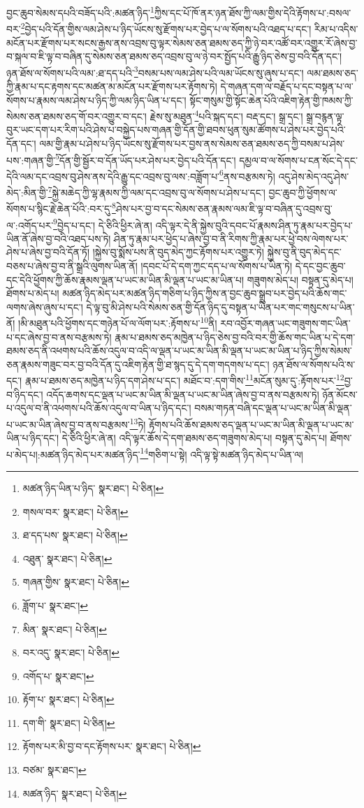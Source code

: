 བྱང་ཆུབ་སེམས་དཔའི་བཟོད་པའི་:མཚན་ཉིད་\footnote{མཚན་ཉིད་ཡིན་པ་ཉིད་  སྣར་ཐང་།  པེ་ཅིན། }ཀྱིས་དང་པོ་ཁོ་ནར་ཉན་ཐོས་ཀྱི་ལམ་གྱིས་དེའི་རྟོགས་པ་:བསལ་བར་\footnote{གསལ་བར་  སྣར་ཐང་།  པེ་ཅིན། }བྱེད་པའི་དོན་གྱིས་ལམ་ཤེས་པ་ཉིད་ཡོངས་སུ་རྫོགས་པར་བྱེད་པ་ལ་སོགས་པའི་འཐད་པ་དང་། རིམ་པ་འདིས་མངོན་པར་རྫོགས་པར་སངས་རྒྱས་ནས་འབྲས་བུ་ལྟར་སེམས་ཅན་ཐམས་ཅད་ཀྱི་ཉེ་བར་འཚོ་བར་འགྱུར་རོ་ཞེས་བྱ་བ་སྐལ་བ་ཇི་ལྟ་བ་བཞིན་དུ་སེམས་ཅན་ཐམས་ཅད་འབྲས་བུ་ལ་ཉེ་བར་སྤྱོད་པའི་རྒྱུ་ཉིད་ཅེས་བྱ་བའི་དོན་དང་། ཉན་ཐོས་ལ་སོགས་པའི་ལམ་:ཐ་དད་པའི་\footnote{ཐ་དད་པས་  སྣར་ཐང་།  པེ་ཅིན། }བསམ་པས་ལམ་ཤེས་པའི་ལམ་ཡོངས་སུ་ཞུས་པ་དང་། ལམ་ཐམས་ཅད་ཀྱི་རྣམ་པ་དང་རྟགས་དང་མཚན་མ་མངོན་པར་རྫོགས་པར་རྟོགས་ཏེ། དེ་གཞན་དག་ལ་བརྗོད་པ་དང་བསྟན་པ་ལ་སོགས་པ་རྣམས་ལམ་ཤེས་པ་ཉིད་ཀྱི་ལམ་ཉིད་ཡིན་པ་དང་། སྟོང་གསུམ་གྱི་སྟོང་ཆེན་པོའི་འཇིག་རྟེན་གྱི་ཁམས་ཀྱི་སེམས་ཅན་ཐམས་ཅད་གོ་བར་འགྱུར་བ་དང་། རྗེས་སུ་མཐུན་\footnote{འཐུན་  སྣར་ཐང་།  པེ་ཅིན། }པའི་སྐད་དང་། བརྡ་དང་། སྒྲ་དང་། སྒྲ་བརྙན་ལྟ་བུར་ཡང་དག་པར་རིག་པའི་ཤེས་པ་བསྐྱེད་པས་གཞན་གྱི་དོན་གྱི་ཐབས་ཕུན་སུམ་ཚོགས་པ་ཤེས་པར་བྱེད་པའི་དོན་དང་། ལམ་གྱི་རྣམ་པ་ཤེས་པ་ཉིད་ཡོངས་སུ་རྫོགས་པར་བྱས་ནས་སེམས་ཅན་ཐམས་ཅད་ཀྱི་བསམ་པ་ཤེས་པས་:གཞན་གྱི་\footnote{གཞན་གྱིས་  སྣར་ཐང་།  པེ་ཅིན། }དོན་གྱི་སྦྱོར་བ་དོན་ཡོད་པར་ཤེས་པར་བྱེད་པའི་དོན་དང་། དམྱལ་བ་ལ་སོགས་པ་ངན་སོང་དེ་དང་དེའི་ལམ་དང་འབྲས་བུ་ཤེས་ནས་དེའི་རྒྱུ་དང་འབྲས་བུ་ལས་:བཟློག་པ་\footnote{ཟློག་པ་  སྣར་ཐང་། }ནས་བརྩམས་ཏེ། འདུ་ཤེས་མེད་འདུ་ཤེས་མེད་:མིན་གྱི་\footnote{མིན་  སྣར་ཐང་།  པེ་ཅིན། }སྐྱེ་མཆེད་ཀྱི་ལྷ་རྣམས་ཀྱི་ལམ་དང་འབྲས་བུ་ལ་སོགས་པ་ཤེས་པ་དང་། བྱང་ཆུབ་ཀྱི་ཕྱོགས་ལ་སོགས་པ་སྙིང་རྗེ་ཆེན་པོའི་:བར་དུ་\footnote{བར་འདུ་  སྣར་ཐང་།  པེ་ཅིན། }ཤེས་པར་བྱ་བ་དང་སེམས་ཅན་རྣམས་ལམ་ཇི་ལྟ་བ་བཞིན་དུ་འབྲས་བུ་ལ་:འགོད་པར་\footnote{འགོད་པ་  སྣར་ཐང་། }བྱེད་པ་དང་། དེ་ཅིའི་ཕྱིར་ཞེ་ན། འདི་ལྟར་དེ་ནི་སྐྱེས་བུའི་དབང་པོ་རྣམས་ཤིན་ཏུ་རྣམ་པར་བྱེད་པ་ཡིན་ནོ་ཞེས་བྱ་བའི་འཐད་པས་ཏེ། ཤིན་ཏུ་རྣམ་པར་ཕྱེད་པ་ཞེས་བྱ་བ་ནི་རིགས་ཀྱི་རྣམ་པར་ཕྱེ་བས་ལེགས་པར་ཤེས་པ་ཞེས་བྱ་བའི་དོན་ཏོ། །སྐྱེས་བུ་སྨོས་པས་ནི་བུད་མེད་ཀྱང་རྟོགས་པར་འགྱུར་ཏེ། སྐྱེས་བུ་ནི་བུད་མེད་དང་བཅས་པ་ཞེས་བྱ་བ་ནི་སྒྲའི་ལུགས་ཡིན་ནོ། །དབང་པོ་དེ་དག་ཀྱང་དད་པ་ལ་སོགས་པ་ཡིན་ཏེ། དེ་དང་བྱང་ཆུབ་དང་དེའི་ཕྱོགས་ཀྱི་ཆོས་རྣམས་ལྡན་པ་ཡང་མ་ཡིན་མི་ལྡན་པ་ཡང་མ་ཡིན་པ། གཟུགས་མེད་པ། བསྟན་དུ་མེད་པ། ཐོགས་པ་མེད་པ། མཚན་ཉིད་མེད་པར་མཚན་ཉིད་གཅིག་པ་ཉིད་ཀྱིས་ན་བྱང་ཆུབ་སྒྲུབ་པར་བྱེད་པའི་ཆོས་གང་ལགས་ཞེས་ཞུས་པ་དང་། དེ་ལྟ་བུ་མི་ཤེས་པའི་སེམས་ཅན་གྱི་དོན་ཉིད་དུ་བསྟན་པ་ཡིན་པར་གང་གསུངས་པ་ཡིན་ནོ། །མི་མཐུན་པའི་ཕྱོགས་དང་གཉེན་པོ་ལ་ལོག་པར་:རྟོགས་པ་\footnote{རྟོག་པ་  སྣར་ཐང་།  པེ་ཅིན། }ནི། རབ་འབྱོར་གཞན་ཡང་གཟུགས་གང་ཡིན་པ་དང་ཞེས་བྱ་བ་ནས་བརྩམས་ཏེ། རྣམ་པ་ཐམས་ཅད་མཁྱེན་པ་ཉིད་ཅེས་བྱ་བའི་བར་གྱི་ཆོས་གང་ཡིན་པ་དེ་དག་ཐམས་ཅད་ནི་འཕགས་པའི་ཆོས་འདུལ་བ་འདི་ལ་ལྡན་པ་ཡང་མ་ཡིན་མི་ལྡན་པ་ཡང་མ་ཡིན་པ་ཉིད་ཀྱིས་སེམས་ཅན་རྣམས་གཟུང་བར་བྱ་བའི་དོན་དུ་འཇིག་རྟེན་གྱི་ཐ་སྙད་དུ་དེ་དག་གདགས་པ་དང་། ཉན་ཐོས་ལ་སོགས་པའི་ས་དང་། རྣམ་པ་ཐམས་ཅད་མཁྱེན་པ་ཉིད་དག་ཤེས་པ་དང་། མཐོང་བ་:དག་གིས་\footnote{དག་གི་  སྣར་ཐང་།  པེ་ཅིན། }མངོན་སུམ་དུ་:རྟོགས་པར་\footnote{རྟོགས་པར་མི་བྱ་བ་དང་རྟོགས་པར་  སྣར་ཐང་།  པེ་ཅིན། }བྱ་བ་ཉིད་དང་། འདོད་ཆགས་དང་ལྡན་པ་ཡང་མ་ཡིན་མི་ལྡན་པ་ཡང་མ་ཡིན་ཞེས་བྱ་བ་ནས་བརྩམས་ཏེ། ཉོན་མོངས་པ་འདུལ་བ་ནི་འཕགས་པའི་ཆོས་འདུལ་བ་ཡིན་པ་ཉིད་དང་། བསམ་གཏན་བཞི་དང་ལྡན་པ་ཡང་མ་ཡིན་མི་ལྡན་པ་ཡང་མ་ཡིན་ཞེས་བྱ་བ་ནས་བརྩམས་\footnote{བཙམ་  སྣར་ཐང་། }ཏེ། རྟོགས་པའི་ཆོས་ཐམས་ཅད་ལྡན་པ་ཡང་མ་ཡིན་མི་ལྡན་པ་ཡང་མ་ཡིན་པ་ཉིད་དང་། དེ་ཅིའི་ཕྱིར་ཞེ་ན། འདི་ལྟར་ཆོས་དེ་དག་ཐམས་ཅད་གཟུགས་མེད་པ། བསྟན་དུ་མེད་པ། ཐོགས་པ་མེད་པ།:མཚན་ཉིད་མེད་པར་མཚན་ཉིད་\footnote{མཚན་ཉིད་  སྣར་ཐང་།  པེ་ཅིན། }གཅིག་པ་སྟེ། འདི་ལྟ་སྟེ་མཚན་ཉིད་མེད་པ་ཡིན་ལ། 